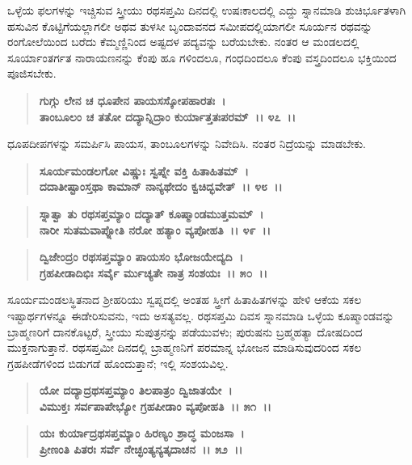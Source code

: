 ಒಳ್ಳೆಯ ಫಲಗಳನ್ನು ಇಚ್ಚಿಸುವ ಸ್ತ್ರೀಯು ರಥಸಪ್ತಮಿ ದಿನದಲ್ಲಿ ಉಷಃಕಾಲದಲ್ಲಿ ಎದ್ದು ಸ್ನಾನಮಾಡಿ ಶುಚಿರ್ಭೂತಳಾಗಿ ಹಸುವಿನ ಕೊಟ್ಟಿಗೆಯಲ್ಲಾಗಲೀ ಅಥವ ತುಳಸೀ ಬೃಂದಾವನದ ಸಮೀಪದಲ್ಲಿಯಾಗಲೀ ಸೂರ್ಯನ ರಥವನ್ನು ರಂಗೋಲೆಯಿಂದ ಬರೆದು ಕೆಮ್ಮಣ್ಣಿನಿಂದ ಅಷ್ಟದಳ ಪದ್ಯವನ್ನು ಬರೆಯಬೇಕು. ನಂತರ ಆ ಮಂಡಲದಲ್ಲಿ ಸೂರ್ಯಾಂತರ್ಗತ ನಾರಾಯಣನನ್ನು ಕೆಂಪು ಹೂ ಗಳಿಂದಲೂ, ಗಂಧದಿಂದಲೂ ಕೆಂಪು ವಸ್ತ್ರದಿಂದಲೂ ಭಕ್ತಿಯಿಂದ ಪೂಜಿಸಬೇಕು.

\begin{verse}
\textbf{ಗುಗ್ಗು ಲೇನ ಚ ಧೂಪೇನ ಪಾಯಸಸ್ಕೋಪಹಾರತಃ~।}\\\textbf{ತಾಂಬೂಲಂ ಚ ತತೋ ದದ್ಯಾನ್ನಿದ್ರಾಂ ಕುರ್ಯಾತ್ತತಃಪರಮ್~।। ೪೭~।।}
\end{verse}

ಧೂಪದೀಪಗಳನ್ನು ಸಮರ್ಪಿಸಿ ಪಾಯಸ, ತಾಂಬೂಲಗಳನ್ನು ನಿವೇದಿಸಿ. ನಂತರ ನಿದ್ರೆಯನ್ನು ಮಾಡಬೇಕು.

\begin{verse}
\textbf{ಸೂರ್ಯಮಂಡಲಗೋ ವಿಷ್ಣುಃ ಸ್ವಪ್ನೇ ವಕ್ತಿ ಹಿತಾಹಿತಮ್‌~।}\\\textbf{ದದಾತೀಷ್ಟಾಂಸ್ತಥಾ ಕಾಮಾನ್ ನಾನ್ಯಥೇದಂ ಕ್ವಚಿದ್ಭವೇತ್~।। ೪೮~।। }
\end{verse}

\begin{verse}
\textbf{ಸ್ನಾತ್ವಾ ತು ರಥಸಪ್ತಮ್ಯಾಂ ದದ್ಯಾತ್ ಕೂಷ್ಮಾಂಡಮುತ್ತಮಮ್~।}\\\textbf{ನಾರೀ ಸುತಮವಾಪ್ನೋತಿ ನರೋ ಹತ್ಯಾಂ ವ್ಯಪೋಹತಿ~।। ೪೯~।। }
\end{verse}

\begin{verse}
\textbf{ದ್ವಿಜೇಂದ್ರಂ ರಥಸಪ್ತಮ್ಯಾಂ ಪಾಯಸಂ ಭೋಜಯೇದ್ಯದಿ~।}\\\textbf{ಗ್ರಹಪೀಡಾದಿಭಿಃ ಸರ್ವೈ ರ್ಮುಚ್ಯತೇ ನಾತ್ರ ಸಂಶಯಃ~।। ೫೦~।।}
\end{verse}

ಸೂರ್ಯಮಂಡಲಸ್ಥಿತನಾದ ಶ‍್ರೀಹರಿಯು ಸ್ವಪ್ನದಲ್ಲಿ ಅಂತಹ ಸ್ತ್ರೀಗೆ ಹಿತಾಹಿತಗಳನ್ನು ಹೇಳಿ ಆಕೆಯ ಸಕಲ ಇಷ್ಟಾರ್ಥಗಳನ್ನೂ ಈಡೇರಿಸುವನು, ಇದು ಅಸತ್ಯವಲ್ಲ. ರಥಸಪ್ತಮಿ ದಿವಸ ಸ್ನಾನಮಾಡಿ ಒಳ್ಳೆಯ ಕೂಷ್ಮಾಂಡವನ್ನು ಬ್ರಾಹ್ಮಣರಿಗೆ ದಾನಕೊಟ್ಟರೆ, ಸ್ತ್ರೀಯು ಸುಪುತ್ರನನ್ನು ಪಡೆಯುವಳು; ಪುರುಷನು ಬ್ರಹ್ಮಹತ್ಯಾ ದೋಷದಿಂದ ಮುಕ್ತನಾಗುತ್ತಾನೆ. ರಥಸಪ್ತಮೀ ದಿನದಲ್ಲಿ ಬ್ರಾಹ್ಮಣನಿಗೆ ಪರಮಾನ್ನ ಭೋಜನ ಮಾಡಿಸುವುದರಿಂದ ಸಕಲ ಗ್ರಹಪೀಡೆಗಳಿಂದ ಬಿಡುಗಡೆ ಹೊಂದುತ್ತಾನೆ; ಇಲ್ಲಿ ಸಂಶಯವಿಲ್ಲ.

\begin{verse}
\textbf{ಯೋ ದದ್ಯಾದ್ರಥಸಪ್ತಮ್ಯಾಂ ತಿಲಪಾತ್ರಂ ದ್ವಿಜಾತಯೇ~।}\\\textbf{ವಿಮುಕ್ತಃ ಸರ್ವಪಾಪೇಭ್ಯೋ ಗ್ರಹಪೀಡಾಂ ವ್ಯಪೋಹತಿ~।। ೫೧~।।}
\end{verse}

\begin{verse}
\textbf{ಯಃ ಕುರ್ಯಾದ್ರಥಸಪ್ತಮ್ಯಾಂ ಹಿರಣ್ಯಂ ಶ್ರಾದ್ಧ ಮಂಜಸಾ~।}\\\textbf{ಪ್ರೀಣಂತಿ ಪಿತರಃ ಸರ್ವೆ ನೇಚ್ಛಂತ್ಯನ್ಯತ್ಕದಾಚನ~।। ೫೨~।।} 
\end{verse}

